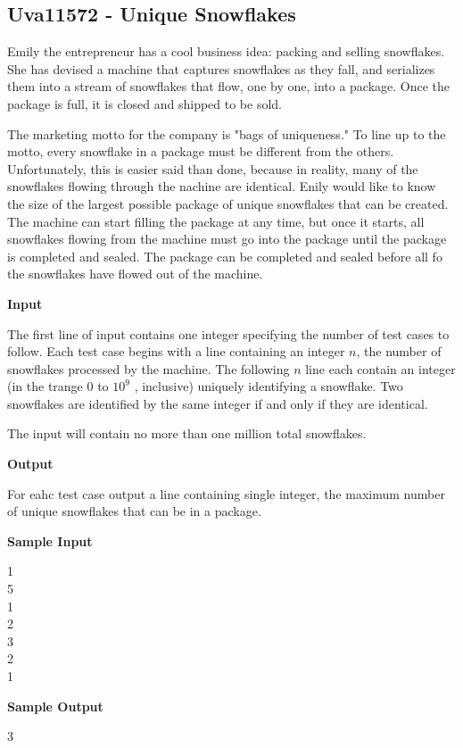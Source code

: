 \subsection{Uva11572 - Unique Snowflakes}
Emily the entrepreneur has a cool business idea: packing and selling snowflakes. She has devised a machine that captures snowflakes as they fall, and serializes them into a stream of snowflakes that flow, one by one, into a package. Once the package is full, it is closed and shipped to be sold.

The marketing motto for the company is "bags of uniqueness." To line up to the motto, every snowflake in a package must be different from the others. Unfortunately, this is easier said than done, because in reality, many of the snowflakes flowing through the nachine are identical. Enily would like to know the size of the largest possible package of unique snowflakes that can be created. The machine can start filling the package at any time, but once it starts, all snowflakes flowing from the machine must go into the package until the package is completed and sealed. The package can be completed and sealed before all fo the snowflakes have flowed out of the machine.

\begin{flushleft}
{\color{red} \textbf{Input}}
\end{flushleft}
The first line of input contains one integer specifying the number of test cases to follow. Each test case begins with a line containing an integer $n$, the number of snowflakes processed by the machine. The following $n$ line each contain an integer (in the trange $0$ to $10^9$ , inclusive) uniquely identifying a snowflake. Two snowflakes are identified by the same integer if and only if they are identical.

The input will contain no more than one million total snowflakes.

\begin{flushleft}
{\color{red} \textbf{Output}}
\end{flushleft}
For eahc test case output a line containing single integer, the maximum number of unique snowflakes that can be in a package.

\begin{flushleft}
{\color{red} \textbf{Sample Input}}
\end{flushleft}
\begin{flushleft}
1\\
5\\
1\\
2\\
3\\
2\\
1\\
\end{flushleft}

\begin{flushleft}
{\color{red} \textbf{Sample Output}}
\end{flushleft}
\begin{flushleft}
3\\
\end{flushleft}

\newpage
